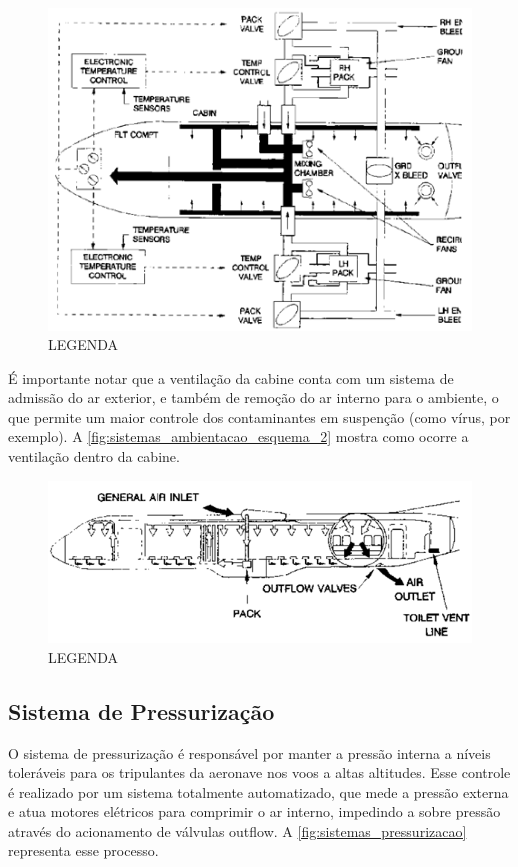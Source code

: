 \begin{figure}
\centering
\includegraphics{images/parte3/sistemas_ambientacao_esquema.png}
\caption{LEGENDA}
\label{fig:sistemas_ambientacao_esquema}
\end{figure}

É importante notar que a ventilação da cabine conta com um sistema de admissão do ar exterior, e também de remoção do ar interno para o ambiente, o que permite um maior controle dos contaminantes em suspenção (como vírus, por exemplo).
A \autoref{fig:sistemas_ambientacao_esquema_2} mostra como ocorre a ventilação dentro da cabine.

\begin{figure}
\centering
\includegraphics{images/parte3/sistemas_ambientacao_esquema_2.png}
\caption{LEGENDA}
\label{fig:sistemas_ambientacao_esquema_2}
\end{figure}

\subsection{Sistema de Pressurização}

O sistema de pressurização é responsável por manter a pressão interna a níveis toleráveis para os tripulantes da aeronave nos voos a altas altitudes.
Esse controle é realizado por um sistema totalmente automatizado, que mede a pressão externa e atua motores elétricos para comprimir o ar interno, impedindo a sobre pressão através do acionamento de válvulas outflow.
A \autoref{fig:sistemas_pressurizacao} representa esse processo.

